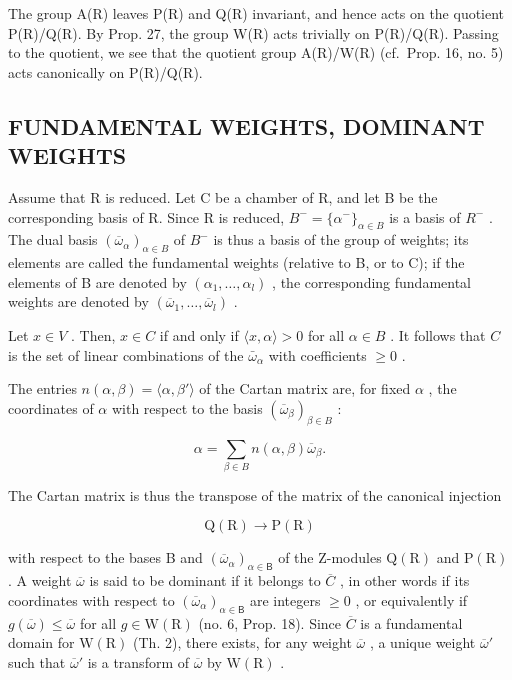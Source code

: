 The group A(R) leaves P(R) and Q(R) invariant, and hence acts on the quotient P(R)/Q(R). By Prop. 27, the group W(R) acts trivially on P(R)/Q(R). Passing to the quotient, we see that the quotient group A(R)/W(R) (cf.~Prop. 16, no. 5) acts canonically on P(R)/Q(R).

\subsection{FUNDAMENTAL WEIGHTS, DOMINANT WEIGHTS}

Assume that R is reduced. Let C be a chamber of R, and let B be the corresponding basis of R. Since R is reduced, \(B^{-} = \{\alpha^{-}\}_{\alpha \in B}\) is a basis of \(R^{-}\) . The dual basis \((\overline{\omega}_{\alpha})_{\alpha \in B}\) of \(B^{-}\) is thus a basis of the group of weights; its elements are called the fundamental weights (relative to B, or to C); if the elements of B are denoted by \((\alpha_{1}, \ldots, \alpha_{l})\) , the corresponding fundamental weights are denoted by \((\overline{\omega}_{1}, \ldots, \overline{\omega}_{l})\) .

Let \(x \in V\) . Then, \(x \in C\) if and only if \(\langle x, \alpha \rangle > 0\) for all \(\alpha \in B\) . It follows that \(C\) is the set of linear combinations of the \(\bar{\omega}_{\alpha}\) with coefficients \(\geqslant 0\) .

The entries \(n(\alpha, \beta) = \langle \alpha, \beta' \rangle\) of the Cartan matrix are, for fixed \(\alpha\) , the coordinates of \(\alpha\) with respect to the basis \((\overline{\omega}_{\beta})_{\beta \in B}\) :

\[
\alpha = \sum_ {\beta \in B} n (\alpha , \beta) \overline {{\omega}} _ {\beta}.\tag{14}
\]

The Cartan matrix is thus the transpose of the matrix of the canonical injection

\[
\mathrm{Q} (\mathrm{R}) \rightarrow \mathrm{P} (\mathrm{R})
\]

with respect to the bases B and \((\overline{\omega}_{\alpha})_{\alpha\in\mathsf{B}}\) of the Z-modules \(\mathrm{Q}(\mathrm{R})\) and \(\mathrm{P}(\mathrm{R})\) . A weight \(\overline{\omega}\) is said to be dominant if it belongs to \(\overline{C}\) , in other words if its coordinates with respect to \((\overline{\omega}_{\alpha})_{\alpha\in\mathsf{B}}\) are integers \(\geqslant0\) , or equivalently if \(g(\overline{\omega})\leqslant\overline{\omega}\) for all \(g\in\mathrm{W}(\mathrm{R})\) (no. 6, Prop. 18). Since \(\overline{C}\) is a fundamental domain for \(\mathrm{W(R)}\) (Th. 2), there exists, for any weight \(\overline{\omega}\) , a unique weight \(\overline{\omega}'\) such that \(\overline{\omega}'\) is a transform of \(\overline{\omega}\) by \(\mathrm{W(R)}\) .

